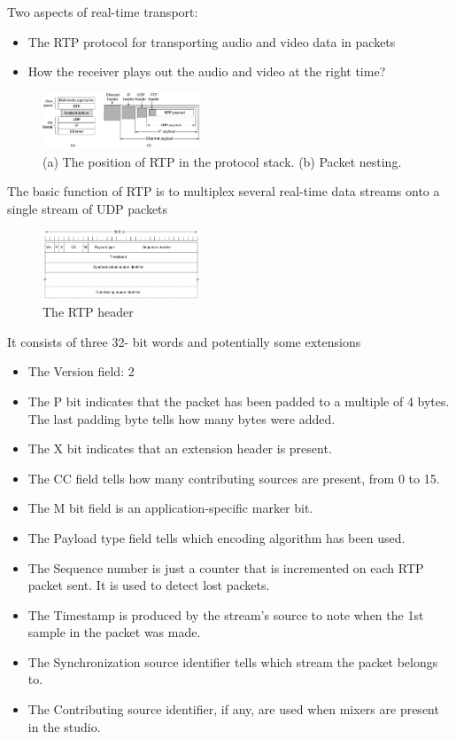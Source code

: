 Two aspects of real-time transport:
\begin{itemize}
    \item The RTP protocol for transporting audio and video data in packets
    \item How the receiver plays out the audio and video at the right time?
\end{itemize}

\begin{figure}[!htb]
    \centering
    \includegraphics[width=0.42\textwidth]{pic/CN6/RTP.png}
    \caption{(a) The position of RTP in the protocol stack. (b) Packet nesting.}
\end{figure}

The basic function of RTP is to multiplex several real-time data streams onto a single stream of UDP packets

\begin{figure}[!htb]
    \centering
    \includegraphics[width=0.42\textwidth]{pic/CN6/The RTP header}
    \caption{The RTP header}
\end{figure}
It consists of three 32- bit words and potentially some extensions
\begin{itemize}\small
    \item The Version field: 2
    \item The P bit indicates that the packet has been padded to a multiple of 4 bytes. The last padding byte tells how many bytes were added.
    \item The X bit indicates that an extension header is present.
    \item The CC field tells how many contributing sources are present, from 0 to 15.
    \item The M bit field is an application-specific marker bit.
    \item The Payload type field tells which encoding algorithm has been used.
    \item The Sequence number is just a counter that is incremented on each RTP packet sent. It is used to detect lost packets.
    \item The Timestamp is produced by the stream’s source to note when the 1st sample in the packet was made.
    \item The Synchronization source identifier tells which stream the packet belongs to.
    \item The Contributing source identifier, if any, are used when mixers are present in the studio.
\end{itemize}

